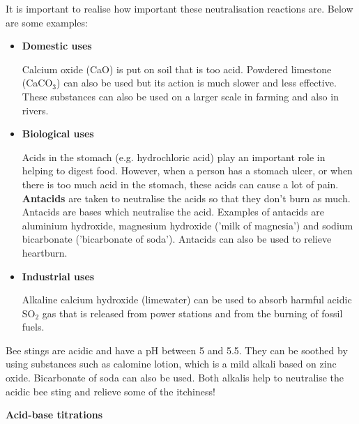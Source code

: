 It is important to realise how important these neutralisation reactions are. Below are some examples:

\begin{itemize}
\item{\textbf{Domestic uses}

Calcium oxide (CaO) is put on soil that is too acid. Powdered limestone (CaCO$_{3}$) can also be used but its action is much slower and less effective. These substances can also be used on a larger scale in farming and also in rivers. }

\item{\textbf{Biological uses}

Acids in the stomach (e.g. hydrochloric acid) play an important role in helping to digest food. However, when a person has a stomach ulcer, or when there is too much acid in the stomach, these acids can cause a lot of pain. \textbf{Antacids} are taken to neutralise the acids so that they don't burn as much. Antacids are bases which neutralise the acid. Examples of antacids are aluminium hydroxide, magnesium hydroxide ('milk of magnesia') and sodium bicarbonate ('bicarbonate of soda'). Antacids can also be used to relieve heartburn.}

\item{\textbf{Industrial uses}

Alkaline calcium hydroxide (limewater) can be used to absorb harmful acidic SO$_{2}$ gas that is released from power stations and from the burning of fossil fuels.
}


\end{itemize}

\begin{IFact}{
Bee stings are acidic and have a pH between 5 and 5.5. They can be soothed by using substances such as calomine lotion, which is a mild alkali based on zinc oxide. Bicarbonate of soda can also be used. Both alkalis help to neutralise the acidic bee sting and relieve some of the itchiness!
}
\end{IFact}

\textbf{Acid-base titrations}\\

